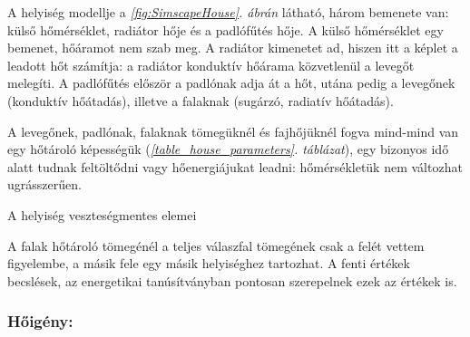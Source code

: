 A helyiség modellje a \textit{\ref{fig:SimscapeHouse}. ábrán} látható, három bemenete van: külső hőmérséklet, radiátor hője és a padlófűtés hője.
A külső hőmérséklet egy  bemenet, hőáramot nem szab meg.
A radiátor  kimenetet ad, hiszen itt a képlet a leadott hőt számítja: a radiátor konduktív hőárama közvetlenül a levegőt melegíti. A padlófűtés először a padlónak adja át a hőt, utána pedig a levegőnek (konduktív hőátadás), illetve a falaknak (sugárzó, radiatív hőátadás).

A levegőnek, padlónak, falaknak tömegüknél és fajhőjüknél fogva mind-mind van egy hőtároló képességük (\textit{\ref{table_house_parameters}. táblázat}), egy bizonyos idő alatt tudnak feltöltődni vagy hőenergiájukat leadni: hőmérsékletük nem változhat ugrásszerűen. %


\begin{table}[H]
	\footnotesize
	\centering

	\renewcommand{\arraystretch}{1.3} %
	\caption{A helyiség hőveszteséget okozó elemei}
	
%		
	\label{table_house_parameters}
\end{table}

\begin{table}[H]
	\footnotesize
	\centering

	\renewcommand{\arraystretch}{1.3} %
	
	\label{table_house_parametersB}
	\caption{A helyiség veszteségmentes elemei}
\end{table}

A falak hőtároló tömegénél a teljes válaszfal tömegének csak a felét vettem figyelembe, a másik fele egy másik helyiséghez tartozhat. A fenti értékek becslések, az energetikai tanúsítványban pontosan szerepelnek ezek az értékek is.


\subsubsection*{Hőigény:}

